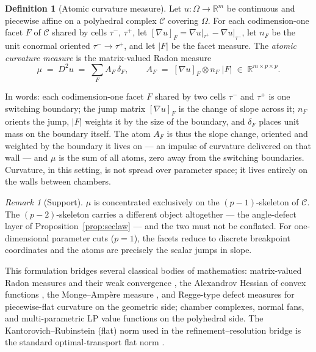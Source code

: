 \documentclass[11pt,a4paper]{article}
\theoremstyle{plain}
\theoremstyle{definition}
\newtheorem{definition}[theorem]{Definition}
\theoremstyle{remark}
\newtheorem{remark}[theorem]{Remark}
\newcommand{\CC}{\mathcal{C}}
\newcommand{\RR}{\mathbb{R}}
\begin{document}
\begin{definition}[Atomic curvature measure]\label{def:mu}
Let $u : \Omega \to \RR^m$ be continuous and piecewise affine on a
polyhedral complex $\CC$ covering $\Omega$. For each codimension-one facet
$F$ of $\CC$ shared by cells $\tau^-$, $\tau^+$, let
$[\nabla u]_F = \nabla u|_{\tau^+} - \nabla u|_{\tau^-}$, let $n_F$ be the
unit conormal oriented $\tau^- \to \tau^+$, and let $|F|$ be the facet
measure. The \emph{atomic curvature measure} is the matrix-valued Radon
measure
\[
\mu \;=\; D^2 u \;=\; \sum_{F} A_F \, \delta_F,
\qquad
A_F \;=\; [\nabla u]_F \otimes n_F \; |F| \;\in\; \RR^{m \times p \times p}.
\]
\end{definition}

In words: each codimension-one facet $F$ shared by two cells
$\tau^-$ and $\tau^+$ is one switching boundary; the jump matrix
$[\nabla u]_F$ is the change of slope across it; $n_F$ orients the
jump, $|F|$ weights it by the size of the boundary, and $\delta_F$
places unit mass on the boundary itself. The atom $A_F$ is thus the
slope change, oriented and weighted by the boundary it lives on --- an
impulse of curvature delivered on that wall --- and $\mu$ is the sum
of all atoms, zero away from the switching boundaries. Curvature, in
this setting, is not spread over parameter space; it lives entirely on
the walls between chambers.

\begin{remark}[Support]\label{rem:support}
$\mu$ is concentrated exclusively on the $(p-1)$-skeleton of $\CC$.
The $(p-2)$-skeleton carries a different object altogether --- the
angle-defect layer of Proposition~\ref{prop:seclaw} --- and the two
must not be conflated. For one-dimensional parameter cuts ($p=1$),
the facets reduce to discrete breakpoint coordinates and the atoms
are precisely the scalar jumps in slope.
\end{remark}

This formulation bridges several classical bodies of mathematics:
matrix-valued Radon measures and their weak convergence
\citep{billingsley1999}, the Alexandrov Hessian of convex functions
\citep{alexandrov1939}, the Monge--Amp\`ere measure \citep{gutierrez2001},
and Regge-type defect measures for piecewise-flat curvature
\citep{regge1961, cheeger1984} on the geometric side; chamber
complexes, normal fans, and multi-parametric LP value functions
\citep{rockafellar1970, ziegler1995, borrelli2003} on the polyhedral
side. The Kantorovich--Rubinstein (flat) norm used in the
refinement--resolution bridge is the standard optimal-transport flat
norm \citep{villani2009}.
\end{document}
